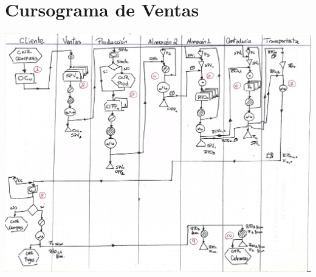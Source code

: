 \pagebreak
\section{Cursograma de Ventas}
\includegraphics[scale=0.8, angle=90]{Empresa/Circuitos/Ventas/ventas.jpg}

\pagebreak
